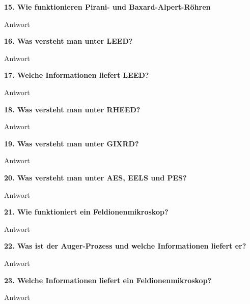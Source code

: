 \noindent\textbf{15. Wie funktionieren Pirani- und Baxard-Alpert-Röhren}\\
\begin{addmargin}[25pt]{0pt}
Antwort\\
\end{addmargin}

\noindent\textbf{16. Was versteht man unter LEED?}\\
\begin{addmargin}[25pt]{0pt}
Antwort\\
\end{addmargin}

\noindent\textbf{17. Welche Informationen liefert LEED?}\\
\begin{addmargin}[25pt]{0pt}
Antwort\\
\end{addmargin}

\noindent\textbf{18. Was versteht man unter RHEED?}\\
\begin{addmargin}[25pt]{0pt}
Antwort\\
\end{addmargin}

\noindent\textbf{19. Was versteht man unter GIXRD?}\\
\begin{addmargin}[25pt]{0pt}
Antwort\\
\end{addmargin}

\noindent\textbf{20. Was versteht man unter AES, EELS und PES?}\\
\begin{addmargin}[25pt]{0pt}
Antwort\\
\end{addmargin}

\noindent\textbf{21. Wie funktioniert ein Feldionenmikroskop?}\\
\begin{addmargin}[25pt]{0pt}
Antwort\\
\end{addmargin}

\noindent\textbf{22. Was ist der Auger-Prozess und welche Informationen liefert er?}\\
\begin{addmargin}[25pt]{0pt}
Antwort\\
\end{addmargin}

\noindent\textbf{23. Welche Informationen liefert ein Feldionenmikroskop?}\\
\begin{addmargin}[25pt]{0pt}
Antwort\\
\end{addmargin}

